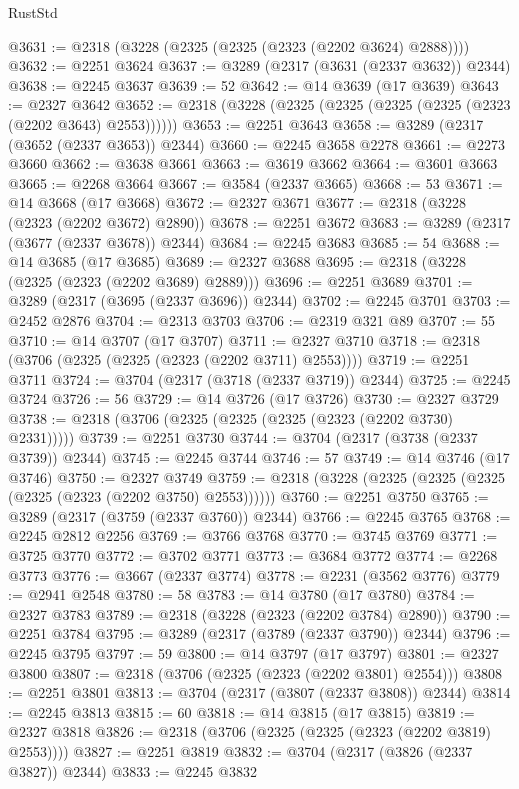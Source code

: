 \begin{lexlean}{RustStd}
\begin{coremodule}
@3631 := @2318 (@3228 (@2325 (@2325 (@2323 (@2202 @3624) @2888))))
@3632 := @2251 @3624
@3637 := @3289 (@2317 (@3631 (@2337 @3632)) @2344)
@3638 := @2245 @3637
@3639 := 52
@3642 := @14 @3639 (@17 @3639)
@3643 := @2327 @3642
@3652 := @2318 (@3228 (@2325 (@2325 (@2325 (@2325 (@2323 (@2202 @3643) @2553))))))
@3653 := @2251 @3643
@3658 := @3289 (@2317 (@3652 (@2337 @3653)) @2344)
@3660 := @2245 @3658 @2278
@3661 := @2273 @3660
@3662 := @3638 @3661
@3663 := @3619 @3662
@3664 := @3601 @3663
@3665 := @2268 @3664
@3667 := @3584 (@2337 @3665)
@3668 := 53
@3671 := @14 @3668 (@17 @3668)
@3672 := @2327 @3671
@3677 := @2318 (@3228 (@2323 (@2202 @3672) @2890))
@3678 := @2251 @3672
@3683 := @3289 (@2317 (@3677 (@2337 @3678)) @2344)
@3684 := @2245 @3683
@3685 := 54
@3688 := @14 @3685 (@17 @3685)
@3689 := @2327 @3688
@3695 := @2318 (@3228 (@2325 (@2323 (@2202 @3689) @2889)))
@3696 := @2251 @3689
@3701 := @3289 (@2317 (@3695 (@2337 @3696)) @2344)
@3702 := @2245 @3701
@3703 := @2452 @2876
@3704 := @2313 @3703
@3706 := @2319 @321 @89
@3707 := 55
@3710 := @14 @3707 (@17 @3707)
@3711 := @2327 @3710
@3718 := @2318 (@3706 (@2325 (@2325 (@2323 (@2202 @3711) @2553))))
@3719 := @2251 @3711
@3724 := @3704 (@2317 (@3718 (@2337 @3719)) @2344)
@3725 := @2245 @3724
@3726 := 56
@3729 := @14 @3726 (@17 @3726)
@3730 := @2327 @3729
@3738 := @2318 (@3706 (@2325 (@2325 (@2325 (@2323 (@2202 @3730) @2331)))))
@3739 := @2251 @3730
@3744 := @3704 (@2317 (@3738 (@2337 @3739)) @2344)
@3745 := @2245 @3744
@3746 := 57
@3749 := @14 @3746 (@17 @3746)
@3750 := @2327 @3749
@3759 := @2318 (@3228 (@2325 (@2325 (@2325 (@2325 (@2323 (@2202 @3750) @2553))))))
@3760 := @2251 @3750
@3765 := @3289 (@2317 (@3759 (@2337 @3760)) @2344)
@3766 := @2245 @3765
@3768 := @2245 @2812 @2256
@3769 := @3766 @3768
@3770 := @3745 @3769
@3771 := @3725 @3770
@3772 := @3702 @3771
@3773 := @3684 @3772
@3774 := @2268 @3773
@3776 := @3667 (@2337 @3774)
@3778 := @2231 (@3562 @3776)
@3779 := @2941 @2548
@3780 := 58
@3783 := @14 @3780 (@17 @3780)
@3784 := @2327 @3783
@3789 := @2318 (@3228 (@2323 (@2202 @3784) @2890))
@3790 := @2251 @3784
@3795 := @3289 (@2317 (@3789 (@2337 @3790)) @2344)
@3796 := @2245 @3795
@3797 := 59
@3800 := @14 @3797 (@17 @3797)
@3801 := @2327 @3800
@3807 := @2318 (@3706 (@2325 (@2323 (@2202 @3801) @2554)))
@3808 := @2251 @3801
@3813 := @3704 (@2317 (@3807 (@2337 @3808)) @2344)
@3814 := @2245 @3813
@3815 := 60
@3818 := @14 @3815 (@17 @3815)
@3819 := @2327 @3818
@3826 := @2318 (@3706 (@2325 (@2325 (@2323 (@2202 @3819) @2553))))
@3827 := @2251 @3819
@3832 := @3704 (@2317 (@3826 (@2337 @3827)) @2344)
@3833 := @2245 @3832

\end{coremodule}
\end{lexlean}
